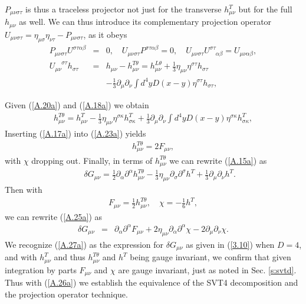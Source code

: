 %
$P_{\mu\nu\sigma\tau}$ is thus a traceless projector not just for the transverse $h_{\mu\nu}^T$ but for the full $h_{\mu\nu}$ as well. We can thus introduce its complementary projection operator $U_{\mu\nu\sigma\tau}=\eta_{\mu\sigma}\eta_{\nu\tau}-P_{\mu\nu\sigma\tau}$, as it obeys
%
\begin{eqnarray}
P_{\mu\nu\sigma\tau}U^{\sigma\tau\alpha\beta}&=&0,\quad
U_{\mu\nu\sigma\tau}P^{\sigma\tau\alpha\beta}=0,\quad
U_{\mu\nu\sigma\tau}U^{\sigma\tau}_{\phantom{\sigma\tau}\alpha\beta}
=U_{\mu\nu\alpha\beta},
\nonumber\\
U_{\mu\nu}^{\phantom{\mu\nu}\sigma\tau}h_{\sigma\tau}&=&h_{\mu\nu}-h^{T\theta}_{\mu\nu}=
h^{L\theta}_{\mu\nu}+\frac{1}{3}\eta_{\mu\nu}\eta^{\sigma\tau}h_{\sigma\tau} 
\nonumber\\
&&
-\frac{1}{3}\partial_{\mu}\partial_{\nu}\int d^4y D(x-y)\eta^{\sigma\tau}h_{\sigma\tau},
\label{A.22a}
\end{eqnarray}
% 

Given (\ref{A.20a}) and (\ref{A.18a}) we obtain 
%
\begin{eqnarray}
h^{T\theta}_{\mu\nu}= h^{T}_{\mu\nu}-\frac{1}{3}\eta_{\mu\nu}\eta^{\sigma\kappa}h^{T}_{\sigma\kappa}
+\frac{1}{3}\partial_{\mu}\partial_{\nu}\int d^4y D(x-y)\eta^{\sigma\kappa}h^{T}_{\sigma\kappa},
\label{A.23a}
\end{eqnarray}
%
Inserting (\ref{A.17a}) into (\ref{A.23a}) yields
%
\begin{eqnarray}
h^{T\theta}_{\mu\nu}=2F_{\mu\nu},
\label{A.24a}
\end{eqnarray}
%
with $\chi$ dropping out. Finally, in terms of $h^{T\theta}_{\mu\nu}$ we can rewrite (\ref{A.15a}) as 
%
\begin{eqnarray}
&&\delta G_{\mu\nu}=
\tfrac{1}{2}\partial_{\alpha}\partial^{\alpha}h_{\mu\nu}^{T\theta}
-\tfrac{1}{3}\eta_{\mu\nu}\partial_{\sigma}\partial^{\sigma}h^{T}
+\tfrac{1}{3}\partial_{\mu}\partial_{\nu}h^{T}.
\label{A.25a}
\end{eqnarray}
%
Then with 
%
\begin{eqnarray}
F_{\mu\nu}=\tfrac{1}{2}h_{\mu\nu}^{T\theta}, \quad \chi=-\tfrac{1}{6}h^{T},
\label{A.26a}
\end{eqnarray}
%
we can rewrite (\ref{A.25a}) as 
%
\begin{eqnarray}
\delta G_{\mu\nu}&=&\partial_{\alpha}\partial^{\alpha}F_{\mu\nu}+2\eta_{\mu\nu}\partial_{\alpha}\partial^{\alpha}\chi-2\partial_{\mu}\partial_{\nu}\chi.
\label{A.27a}
\end{eqnarray}
%
We recognize (\ref{A.27a}) as the expression for $\delta G_{\mu\nu}$ as given in (\ref{3.10}) when $D=4$, and with $h^T_{\mu\nu}$ and thus $h^{T\theta}_{\mu\nu}$ and $h^T$ being gauge invariant, we confirm that given integration by parts $F_{\mu\nu}$ and $\chi$ are gauge invariant, just as noted in Sec. \ref{s:svtd}. Thus with (\ref{A.26a})
we establish the equivalence of the  SVT4 decomposition and the projection operator technique.

